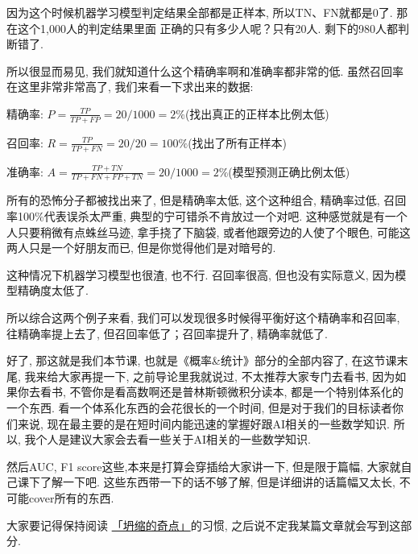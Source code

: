 因为这个时候机器学习模型判定结果全部都是正样本, 所以TN、FN就都是0了. 那在这个1,000人的判定结果里面
正确的只有多少人呢？只有20人. 剩下的980人都判断错了. 

所以很显而易见, 我们就知道什么这个精确率啊和准确率都非常的低. 虽然召回率在这里非常非常高了, 我们来看一下求出来的数据: 

精确率: $P=\frac{TP}{TP+FP} =20/1000 = 2\%$(找出真正的正样本比例太低)

召回率: $R=\frac{TP}{TP+FN} = 20/20 = 100\%$(找出了所有正样本)

准确率: $A=\frac{TP+TN}{TP+FN+FP+TN} = 20/1000 = 2\%$(模型预测正确比例太低)

所有的恐怖分子都被找出来了, 但是精确率太低, 这个这种组合, 精确率过低, 召回率100\%代表误杀太严重, 典型的宁可错杀不肯放过一个对吧. 这种感觉就是有一个人只要稍微有点蛛丝马迹, 拿手挠了下脑袋, 或者他跟旁边的人使了个眼色, 可能这两人只是一个好朋友而已, 但是你觉得他们是对暗号的. 

这种情况下机器学习模型也很渣, 也不行. 召回率很高, 但也没有实际意义, 因为模型精确度太低了. 

所以综合这两个例子来看, 我们可以发现很多时候得平衡好这个精确率和召回率, 往精确率提上去了, 但召回率低了；召回率提升了, 精确率就低了. 

好了, 那这就是我们本节课, 也就是《概率\&统计》部分的全部内容了, 在这节课末尾, 我来给大家再提一下, 之前导论里我就说过, 不太推荐大家专门去看书, 因为如果你去看书, 不管你是看高数啊还是普林斯顿微积分读本, 都是一个特别体系化的一个东西. 看一个体系化东西的会花很长的一个时间, 但是对于我们的目标读者你们来说, 现在最主要的是在短时间内能迅速的掌握好跟AI相关的一些数学知识. 所以, 我个人是建议大家会去看一些关于AI相关的一些数学知识. 

然后AUC, F1 score这些,本来是打算会穿插给大家讲一下, 但是限于篇幅, 大家就自己课下了解一下吧. 这些东西带一下的话不够了解, 但是详细讲的话篇幅又太长, 不可能cover所有的东西. 

大家要记得保持阅读 \href{http://mp.weixin.qq.com/mp/homepage?__biz=MzA4NzE4MDQzMg==&hid=1&sn=4662a6b4305960a2e30a70c26fcefa53&scene=18#wechat_redirect}{「坍缩的奇点」}的习惯, 之后说不定我某篇文章就会写到这部分. 
